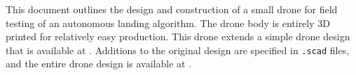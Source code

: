 This document outlines the design and construction of a small drone for field testing of an autonomous landing algorithm.
The drone body is entirely 3D printed for relatively easy production.
This drone extends a simple drone design that is available at \cite{thingiverse_rpi_drone}.
Additions to the original design are specified in \texttt{.scad} files, and the entire drone design is available at \cite{github_rpi_drone}.

